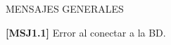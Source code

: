 MENSAJES GENERALES
	\begin{Citemize}
	\item {\bf [MSJ1.1]} Error al conectar a la BD.
	\end{Citemize}
